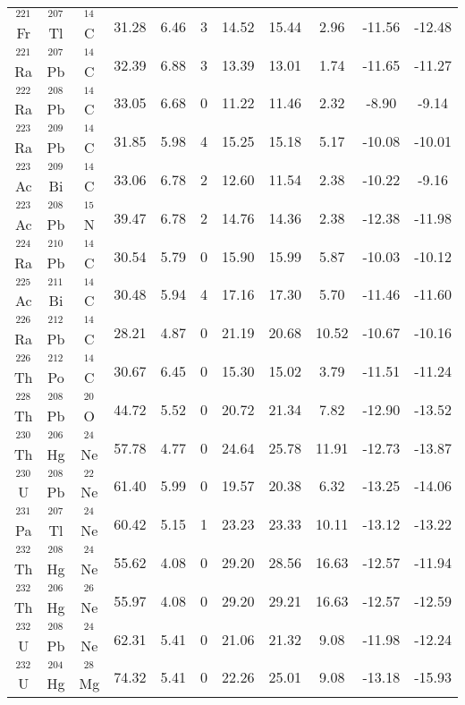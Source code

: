 \documentclass[preprint,10pt]{elsarticle}
\begin{document}
\begin{table*}[!htbp]
{\begin{tabular}{ccccccccccc}
 \hline
$^{221}$Fr & $^{207}$Tl & $^{14}$C  &31.28  & 6.46& 3&14.52  & 15.44  & 2.96  &  -11.56 & -12.48 \\
$^{221}$Ra & $^{207}$Pb & $^{14}$C  &32.39  & 6.88& 3&13.39  & 13.01  & 1.74  &  -11.65 & -11.27 \\
$^{222}$Ra & $^{208}$Pb & $^{14}$C  &33.05  & 6.68& 0&11.22  & 11.46  & 2.32  &  -8.90  & -9.14 \\
$^{223}$Ra & $^{209}$Pb & $^{14}$C  &31.85  & 5.98& 4&15.25  & 15.18  & 5.17  &  -10.08 & -10.01 \\
$^{223}$Ac & $^{209}$Bi & $^{14}$C  &33.06  & 6.78& 2&12.60  & 11.54  & 2.38  &  -10.22 & -9.16 \\
$^{223}$Ac & $^{208}$Pb & $^{15}$N  &39.47  & 6.78& 2&14.76  & 14.36  & 2.38  &  -12.38 & -11.98 \\
$^{224}$Ra & $^{210}$Pb & $^{14}$C  &30.54  & 5.79& 0&15.90  & 15.99  & 5.87  &  -10.03 & -10.12 \\
$^{225}$Ac & $^{211}$Bi & $^{14}$C  &30.48  & 5.94& 4&17.16  & 17.30  & 5.70  &  -11.46 & -11.60 \\
$^{226}$Ra & $^{212}$Pb & $^{14}$C  &28.21  & 4.87& 0&21.19  & 20.68  & 10.52 &  -10.67 & -10.16 \\
$^{226}$Th & $^{212}$Po & $^{14}$C  &30.67  & 6.45& 0&15.30  & 15.02  & 3.79  &  -11.51 & -11.24 \\
$^{228}$Th & $^{208}$Pb & $^{20}$O  &44.72  & 5.52& 0&20.72  & 21.34  & 7.82  &  -12.90 & -13.52 \\
$^{230}$Th & $^{206}$Hg & $^{24}$Ne &57.78  & 4.77& 0&24.64  & 25.78  & 11.91 &  -12.73 & -13.87 \\
$^{230}$U  & $^{208}$Pb & $^{22}$Ne &61.40  & 5.99& 0&19.57  & 20.38  & 6.32  &  -13.25 & -14.06 \\
$^{231}$Pa & $^{207}$Tl & $^{24}$Ne &60.42  & 5.15& 1&23.23  & 23.33  & 10.11 &  -13.12 & -13.22 \\
$^{232}$Th & $^{208}$Hg & $^{24}$Ne &55.62  & 4.08& 0&29.20  & 28.56  & 16.63 &  -12.57 & -11.94 \\
$^{232}$Th & $^{206}$Hg & $^{26}$Ne &55.97  & 4.08& 0&29.20  & 29.21  & 16.63 &  -12.57 & -12.59 \\
$^{232}$U  & $^{208}$Pb & $^{24}$Ne &62.31  & 5.41& 0&21.06  & 21.32  & 9.08  &  -11.98 & -12.24 \\
$^{232}$U  & $^{204}$Hg & $^{28}$Mg &74.32  & 5.41& 0&22.26  & 25.01  & 9.08  &  -13.18 & -15.93 \\

\end{tabular}}
\end{table*}
\end{document}
